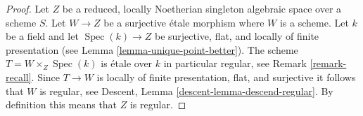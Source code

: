 \documentclass{stacks-project}
\theoremstyle{plain}
\theoremstyle{definition}
\theoremstyle{remark}
\numberwithin{equation}{subsection}
\def\Spec{\mathop{\mathrm{Spec}}}
\begin{document}
\begin{proof}
Let $Z$ be a reduced, locally Noetherian singleton algebraic space
over a scheme $S$. Let $W \to Z$ be a surjective \'etale morphism where $W$
is a scheme. Let $k$ be a field and let $\Spec(k) \to Z$
be surjective, flat, and locally of finite presentation (see
Lemma \ref{lemma-unique-point-better}).
The scheme $T = W \times_Z \Spec(k)$ is
\'etale over $k$ in particular regular, see
Remark \ref{remark-recall}.
Since $T \to W$ is locally of finite presentation, flat, and surjective it
follows that $W$ is regular, see
Descent, Lemma \ref{descent-lemma-descend-regular}.
By definition this means that $Z$ is regular.
\end{proof}
\end{document}
